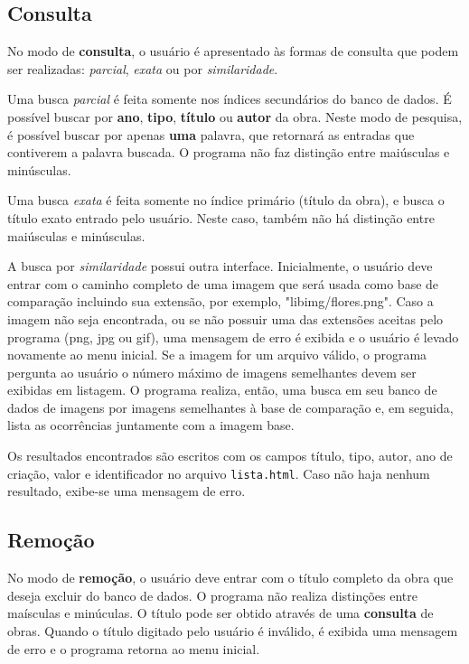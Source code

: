 \documentclass[a4paper,10pt]{article}
\begin{document}
\subsection{Consulta}
No modo de \textbf{consulta}, o usuário é apresentado às formas de consulta que podem ser realizadas: \textit{parcial}, \textit{exata} ou por \textit{similaridade}.

Uma busca \textit{parcial} é feita somente nos índices secundários do banco de dados. É possível buscar por \textbf{ano}, \textbf{tipo}, \textbf{título} ou \textbf{autor} da obra. Neste modo de pesquisa, é possível buscar por apenas \textbf{uma} palavra, que retornará as entradas que contiverem a palavra buscada. O programa não faz distinção entre maiúsculas e minúsculas.

Uma busca \textit{exata} é feita somente no índice primário (título da obra), e busca o título exato entrado pelo usuário. Neste caso, também não há distinção entre maiúsculas e minúsculas.

A busca por \textit{similaridade} possui outra interface. Inicialmente, o usuário deve entrar com o caminho completo de uma imagem que será usada como base de comparação incluindo sua extensão, por exemplo, "libimg/flores.png". Caso a imagem não seja encontrada, ou se não possuir uma das extensões aceitas pelo programa (png, jpg ou gif), uma mensagem de erro é exibida e o usuário é levado novamente ao menu inicial. Se a imagem for um arquivo válido, o programa pergunta ao usuário o número máximo de imagens semelhantes devem ser exibidas em listagem. O programa realiza, então, uma busca em seu banco de dados de imagens por imagens semelhantes à base de comparação e, em seguida, lista as ocorrências juntamente com a imagem base.

Os resultados encontrados são escritos com os campos título, tipo, autor, ano de criação, valor e identificador no arquivo \texttt{lista.html}. Caso não haja nenhum resultado, exibe-se uma mensagem de erro.

\subsection{Remoção}
No modo de \textbf{remoção}, o usuário deve entrar com o título completo da obra que deseja excluir do banco de dados. O programa não realiza distinções entre maísculas e minúculas. O título pode ser obtido através de uma \textbf{consulta} de obras. Quando o título digitado pelo usuário é inválido, é exibida uma mensagem de erro e o programa retorna ao menu inicial.
\end{document}
